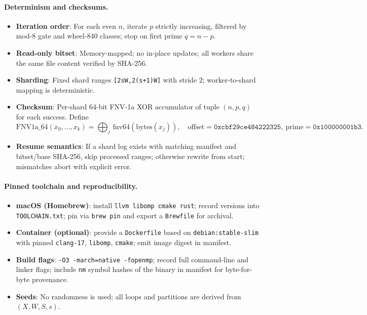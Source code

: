 \documentclass[11pt]{article}
\theoremstyle{definition}
\theoremstyle{remark}
\begin{document}
\paragraph{Determinism and checksums.}
\begin{itemize}
  \item \textbf{Iteration order}: For each even $n$, iterate $p$ strictly increasing, filtered by mod-8 gate and wheel-$840$ classes; stop on first prime $q=n{-}p$.
  \item \textbf{Read-only bitset}: Memory-mapped; no in-place updates; all workers share the same file content verified by SHA-256.
  \item \textbf{Sharding}: Fixed shard ranges \texttt{[2sW,2(s{+}1)W]} with stride $2$; worker-to-shard mapping is deterministic.
  \item \textbf{Checksum}: Per-shard 64-bit FNV-1a XOR accumulator of tuple $(n,p,q)$ for each success. Define
  \[
    \mathrm{FNV1a\_64}(x_0,\dots,x_k)=\bigoplus_{j}\,\mathrm{fnv64}(\mathrm{bytes}(x_j)),\quad\mathrm{offset}=\texttt{0xcbf29ce484222325},\ \mathrm{prime}=\texttt{0x100000001b3}.
  \]
  \item \textbf{Resume semantics}: If a shard log exists with matching manifest and bitset/base SHA-256, skip processed ranges; otherwise rewrite from start; mismatches abort with explicit error.
\end{itemize}

\paragraph{Pinned toolchain and reproducibility.}
\begin{itemize}
  \item \textbf{macOS (Homebrew)}: install \texttt{llvm libomp cmake rust}; record versions into \texttt{TOOLCHAIN.txt}; pin via \texttt{brew pin} and export a \texttt{Brewfile} for archival.
  \item \textbf{Container (optional)}: provide a \texttt{Dockerfile} based on \texttt{debian:stable-slim} with pinned \texttt{clang-17}, \texttt{libomp}, \texttt{cmake}; emit image digest in manifest.
  \item \textbf{Build flags}: \texttt{-O3 -march=native -fopenmp}; record full command-line and linker flags; include \texttt{nm} symbol hashes of the binary in manifest for byte-for-byte provenance.
  \item \textbf{Seeds}: No randomness is used; all loops and partitions are derived from $(X,W,S,s)$.
\end{itemize}
\end{document}
